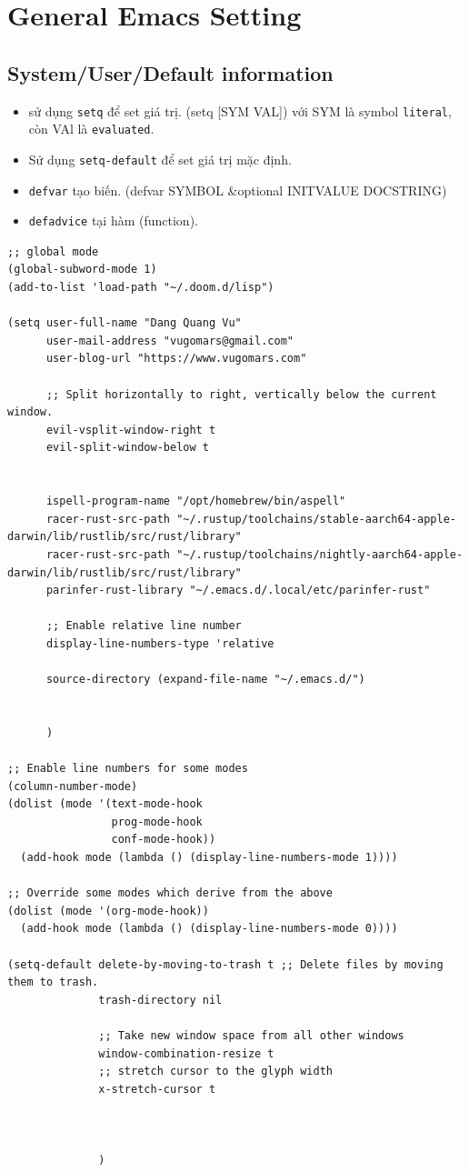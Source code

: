 \documentclass[11pt]{article}
\begin{document}
\section{General Emacs Setting}
\label{sec:org683ff98}
\subsection{System/User/Default information}
\label{sec:org0912792}
\begin{itemize}
\item sử dụng \texttt{setq} để set giá trị. (setq [SYM VAL]) với SYM là symbol \texttt{literal}, còn VAl là \texttt{evaluated}.
\item Sử dụng \texttt{setq-default} để set giá trị mặc định.
\item \texttt{defvar} tạo biến. (defvar SYMBOL \&optional INITVALUE DOCSTRING)
\item \texttt{defadvice} tại hàm (function).
\end{itemize}
\begin{verbatim}
;; global mode
(global-subword-mode 1)
(add-to-list 'load-path "~/.doom.d/lisp")

(setq user-full-name "Dang Quang Vu"
      user-mail-address "vugomars@gmail.com"
      user-blog-url "https://www.vugomars.com"

      ;; Split horizontally to right, vertically below the current window.
      evil-vsplit-window-right t
      evil-split-window-below t


      ispell-program-name "/opt/homebrew/bin/aspell"
      racer-rust-src-path "~/.rustup/toolchains/stable-aarch64-apple-darwin/lib/rustlib/src/rust/library"
      racer-rust-src-path "~/.rustup/toolchains/nightly-aarch64-apple-darwin/lib/rustlib/src/rust/library"
      parinfer-rust-library "~/.emacs.d/.local/etc/parinfer-rust"

      ;; Enable relative line number
      display-line-numbers-type 'relative

      source-directory (expand-file-name "~/.emacs.d/")


      )

;; Enable line numbers for some modes
(column-number-mode)
(dolist (mode '(text-mode-hook
                prog-mode-hook
                conf-mode-hook))
  (add-hook mode (lambda () (display-line-numbers-mode 1))))

;; Override some modes which derive from the above
(dolist (mode '(org-mode-hook))
  (add-hook mode (lambda () (display-line-numbers-mode 0))))

(setq-default delete-by-moving-to-trash t ;; Delete files by moving them to trash.
              trash-directory nil

              ;; Take new window space from all other windows
              window-combination-resize t
              ;; stretch cursor to the glyph width
              x-stretch-cursor t



              )


\end{verbatim}
\end{document}
